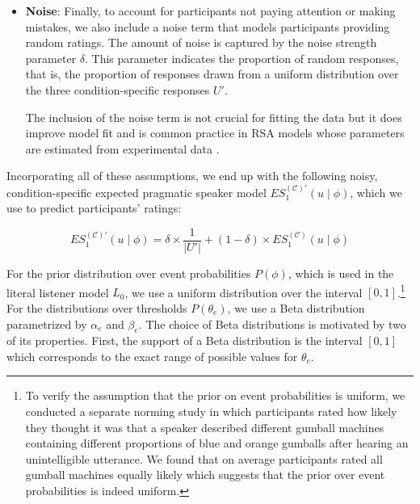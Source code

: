 \begin{itemize}
\item \textbf{Noise}: Finally, to account for participants not paying attention or making mistakes, 
we also include a noise term that models participants providing random ratings.
The amount of noise is captured by the noise strength parameter $\delta$. This parameter
indicates the proportion of random responses, that is, the proportion of responses drawn from a uniform distribution
over the three condition-specific responses $U'$. 

The inclusion of the noise term is not crucial for fitting the data but it does improve model fit and
is common practice in RSA models whose parameters are estimated from experimental data \cite[see][]{Herbstritt2019,Tessler2019}.

\end{itemize}

\noindent Incorporating all of these assumptions, we end up with the following noisy, condition-specific expected pragmatic speaker 
model $ES_1^{(\mathscr{C})'}(u \mid \phi)$, which we use to predict participants' ratings:

$$ES_1^{(\mathscr{C})'}(u \mid \phi) = \delta \times \frac{1}{|U'|} +  (1 - \delta) \times ES_1^{(\mathscr{C})}(u \mid \phi)$$

For the prior distribution over event probabilities $P(\phi)$, which is used in the literal listener model $L_0$, 
we use a uniform distribution over the interval $[0,1]$.\footnote{To 
verify the assumption that the prior on event probabilities is uniform, we conducted a separate norming study in which participants rated 
how likely they thought it was that a speaker described different gumball machines containing different 
proportions of blue and orange gumballs after hearing an unintelligible utterance. We found that on average 
participants rated all gumball machines equally likely which suggests that the prior over event probabilities is 
indeed uniform.} For the distributions over thresholds $P(\theta_e)$, we use a Beta distribution parametrized by 
$\alpha_e$ and $\beta_e$. The choice of Beta distributions is motivated by two of its properties. First, the support of a Beta distribution 
is the interval $[0,1]$ which corresponds to the exact range of possible values for $\theta_e$.

